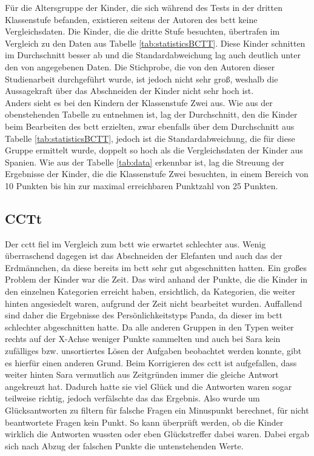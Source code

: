 	Für die Altersgruppe der Kinder, die sich während des Tests in der dritten Klassenstufe befanden, existieren seitens der Autoren des \acrshort{bctt} keine Vergleichsdaten. Die Kinder, die die dritte Stufe besuchten, übertrafen im Vergleich zu den Daten aus Tabelle \ref{tab:statisticsBCTT}. Diese Kinder schnitten im Durchschnitt besser ab und die Standardabweichung lag auch deutlich unter den von \citeauthor{bcct} angegebenen Daten. Die Stichprobe, die von den Autoren dieser Studienarbeit durchgeführt wurde, ist jedoch nicht sehr groß, weshalb die Aussagekraft über das Abschneiden der Kinder nicht sehr hoch ist.\\
	Anders sieht es bei den Kindern der Klassenstufe Zwei aus. Wie aus der obenstehenden Tabelle zu entnehmen ist, lag der Durchschnitt, den die Kinder beim Bearbeiten des \acrlong{bctt} erzielten, zwar ebenfalls über dem Durchschnitt aus Tabelle \ref{tab:statisticsBCTT}, jedoch ist die Standardabweichung, die für diese Gruppe ermittelt wurde, doppelt so hoch als die Vergleichsdaten der Kinder aus Spanien. Wie aus der Tabelle \ref{tab:data} erkennbar ist, lag die Streuung der Ergebnisse der Kinder, die die Klassenstufe Zwei besuchten, in einem Bereich von 10 Punkten bis hin zur maximal erreichbaren Punktzahl von 25 Punkten.   
	\subsection{CCTt}
	Der \acrshort{cctt} fiel im Vergleich zum \acrshort{bctt} wie erwartet schlechter aus. Wenig überraschend dagegen ist das Abschneiden der Elefanten und auch das der Erdmännchen, da diese bereits im \acrshort{bctt} sehr gut abgeschnitten hatten. Ein großes Problem der Kinder war die Zeit. Das wird anhand der Punkte, die die Kinder in den einzelnen Kategorien erreicht haben, ersichtlich, da Kategorien, die weiter hinten angesiedelt waren, aufgrund der Zeit nicht bearbeitet wurden. Auffallend sind daher die Ergebnisse des Persönlichkeitstyps Panda, da dieser im \acrshort{bctt} schlechter abgeschnitten hatte. Da alle anderen Gruppen in den Typen weiter rechts auf der X-Achse weniger Punkte sammelten und auch bei Sara kein zufälliges bzw. unsortiertes Lösen der Aufgaben beobachtet werden konnte, gibt es hierfür einen anderen Grund. Beim Korrigieren des \acrshort{cctt} ist aufgefallen, dass weiter hinten Sara vermutlich aus Zeitgründen immer die gleiche Antwort angekreuzt hat. Dadurch hatte sie viel Glück und die Antworten waren sogar teilweise richtig, jedoch verfälschte das das Ergebnis. Also wurde um Glücksantworten zu filtern für falsche Fragen ein Minuspunkt berechnet, für nicht beantwortete Fragen kein Punkt. So kann überprüft werden, ob die Kinder wirklich die Antworten wussten oder eben Glückstreffer dabei waren. Dabei ergab sich nach Abzug der falschen Punkte die untenstehenden Werte.
	
